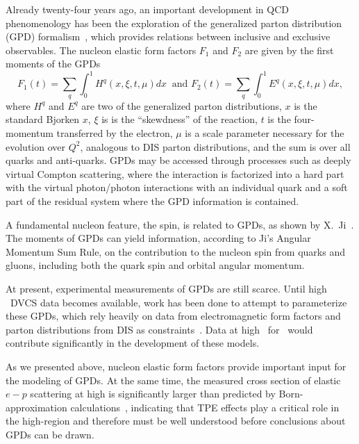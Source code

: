Already twenty-four years ago, an important development in QCD phenomenology has been the exploration of the generalized parton distribution (GPD) formalism~\cite{Mueller:1998fv, Ji:1996ek, Radyushkin:1996nd}, which provides relations between inclusive and exclusive observables.
The nucleon elastic form factors $F_1$ and $F_2$ are given by the first moments of the GPDs
%
\begin{equation}
F_1(t) = \sum_q \int^1_0 H^q (x,\xi,t,\mu) dx\ 
 \mbox{  and\  }
F_2(t) = \sum_q \int^1_0 E^q (x,\xi,t,\mu) dx,
\label{eq:F1/2}
\end{equation}
%
where $H^q$ and $E^q$ are two of the generalized parton distributions, $x$ is the standard Bjorken $x$, $\xi$ is is the ``skewdness'' of the reaction, $t$ is the four-momentum transferred by the electron, $\mu$ is a scale parameter necessary for the evolution over $Q^2$, analogous to DIS parton distributions, and the sum is over all quarks and anti-quarks.  
GPDs may be accessed through processes such as deeply virtual Compton scattering, where the interaction is factorized into a hard part with the virtual photon/photon interactions with an individual quark and a soft part of the residual system where the GPD information is contained.

A fundamental nucleon feature, the spin, is related to GPDs, as shown by X.~Ji~\cite{Ji:1996ek}. 
The moments of GPDs can yield information, according to Ji's Angular Momentum Sum Rule, 
on the contribution to the nucleon spin from quarks and gluons, including both the quark spin and orbital angular momentum.

At present, experimental measurements of GPDs are still scarce.  
Until high \qsq~DVCS data becomes available, work has been done to attempt to parameterize these GPDs,  
which rely heavily on data from electromagnetic form factors and parton distributions from DIS as constraints~\cite{Diehl:2013xca}.  
Data at high \qsq~for \gen~would contribute significantly in the development of these models.

%
As we presented above, nucleon elastic form factors provide important input for the modeling of GPDs.
At the same time, the measured cross section of elastic $e-p$ scattering at high \qsq
 is significantly larger than predicted by Born-approximation calculations~\cite{Kivel2020ab}, indicating that TPE effects play
a critical role in the high-\qsq region and therefore must be well understood
before conclusions about GPDs can be drawn.\\

